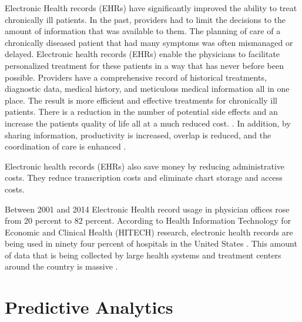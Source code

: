 \documentclass[sigconf]{acmart}
\begin{document}
Electronic Health records (EHRs) have significantly improved the ability to treat chronically ill patients.  In the past, providers had to limit the decisions to the amount of information that was available to them. The planning of care of a chronically diseased patient that had many symptoms was often mismanaged or delayed.  Electronic health records (EHRs) enable the physicians to facilitate personalized treatment for these patients in a way that has never before been possible. Providers have a comprehensive record of historical treatments, diagnostic data, medical history, and meticulous medical information all in one place. The result is more efficient and effective treatments for chronically ill patients. There is a reduction in the number of potential side effects and an increase the patients quality of life all at a much reduced cost. \cite{www-google-christian}.  In addition, by sharing information, productivity is increased, overlap is reduced, and the coordination of care is enhanced \cite{www-google-christian}.

Electronic health records (EHRs) also save money by reducing administrative costs. They reduce transcription costs and eliminate chart storage and access costs.

Between 2001 and 2014 Electronic Health record usage in physician offices rose from 20 percent to 82 percent.  According to Health Information Technology for Economic and Clinical Health (HITECH) research, electronic health records are being used in ninety four percent of hospitals in the United States \cite{www-google-datapine}.   This amount of data that is being collected by large health systems and treatment centers around the country is massive \cite{www-google-pred}. 

\section{Predictive Analytics}
\end{document}
